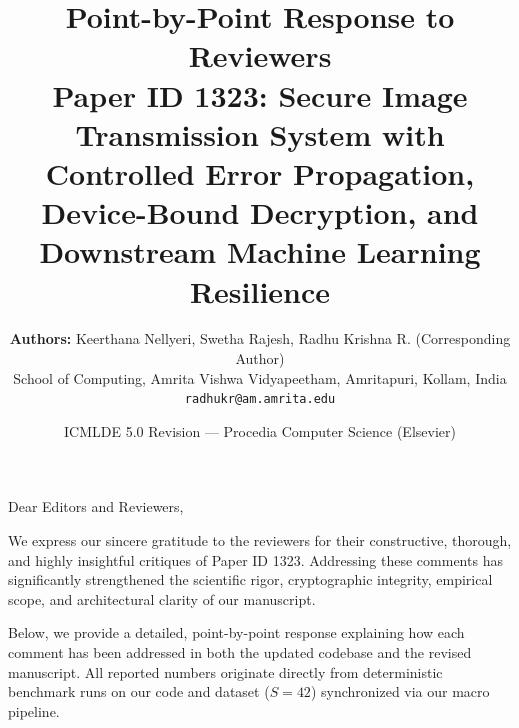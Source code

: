 \documentclass[11pt,a4paper]{article}
\title{\textbf{Point-by-Point Response to Reviewers}\\\large Paper ID 1323: Secure Image Transmission System with Controlled Error Propagation, Device-Bound Decryption, and Downstream Machine Learning Resilience}
\author{\textbf{Authors:} Keerthana Nellyeri, Swetha Rajesh, Radhu Krishna R. (Corresponding Author)\\
School of Computing, Amrita Vishwa Vidyapeetham, Amritapuri, Kollam, India\\
\texttt{radhukr@am.amrita.edu}}
\date{ICMLDE 5.0 Revision --- Procedia Computer Science (Elsevier)}
\begin{document}
\maketitle

\noindent Dear Editors and Reviewers,

We express our sincere gratitude to the reviewers for their constructive, thorough, and highly insightful critiques of Paper ID 1323. Addressing these comments has significantly strengthened the scientific rigor, cryptographic integrity, empirical scope, and architectural clarity of our manuscript.

Below, we provide a detailed, point-by-point response explaining how each comment has been addressed in both the updated codebase and the revised manuscript. All reported numbers originate directly from deterministic benchmark runs on our code and dataset ($S = 42$) synchronized via our macro pipeline.
\end{document}
